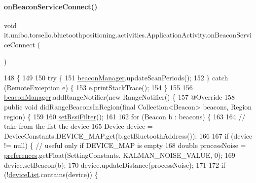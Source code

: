 \paragraph{\texorpdfstring{on\+Beacon\+Service\+Connect()}{onBeaconServiceConnect()}}
{\footnotesize\ttfamily void it.\+unibo.\+torsello.\+bluetoothpositioning.\+activities.\+Application\+Activity.\+on\+Beacon\+Service\+Connect (\begin{DoxyParamCaption}{ }\end{DoxyParamCaption})}


\begin{DoxyCode}
148                                          \{
149 
150         \textcolor{keywordflow}{try} \{
151             \hyperlink{classit_1_1unibo_1_1torsello_1_1bluetoothpositioning_1_1activities_1_1ApplicationActivity_a973c37226a3dbba6016966c3555aff65_a973c37226a3dbba6016966c3555aff65}{beaconManager}.updateScanPeriods();
152         \} \textcolor{keywordflow}{catch} (RemoteException e) \{
153             e.printStackTrace();
154         \}
155 
156         \hyperlink{classit_1_1unibo_1_1torsello_1_1bluetoothpositioning_1_1activities_1_1ApplicationActivity_a973c37226a3dbba6016966c3555aff65_a973c37226a3dbba6016966c3555aff65}{beaconManager}.addRangeNotifier(\textcolor{keyword}{new} RangeNotifier() \{
157             @Override
158             \textcolor{keyword}{public} \textcolor{keywordtype}{void} didRangeBeaconsInRegion(\textcolor{keyword}{final} Collection<Beacon> beacons, Region region) \{
159 
160                 \hyperlink{classit_1_1unibo_1_1torsello_1_1bluetoothpositioning_1_1activities_1_1ApplicationActivity_a8b2514096adfe574c15cc5317a45cd58_a8b2514096adfe574c15cc5317a45cd58}{setRssiFilter}();
161 
162                 \textcolor{keywordflow}{for} (Beacon b : beacons) \{
163 
164                     \textcolor{comment}{// take from the list the device}
165                     Device device = DeviceConstants.DEVICE\_MAP.get(b.getBluetoothAddress());
166 
167                     \textcolor{keywordflow}{if} (device != null) \{ \textcolor{comment}{// useful only if DEVICE\_MAP is empty}
168                         \textcolor{keywordtype}{double} processNoise = \hyperlink{classit_1_1unibo_1_1torsello_1_1bluetoothpositioning_1_1activities_1_1ApplicationActivity_a3ee672ef79c268d0618ff3276c2e85f0_a3ee672ef79c268d0618ff3276c2e85f0}{preferences}.getFloat(SettingConstants.
      KALMAN\_NOISE\_VALUE, 0);
169                         device.setBeacon(b);
170                         device.updateDistance(processNoise);
171 
172                         \textcolor{keywordflow}{if} (!\hyperlink{classit_1_1unibo_1_1torsello_1_1bluetoothpositioning_1_1activities_1_1ApplicationActivity_ad146f35cfee210f7191442658a235a2f_ad146f35cfee210f7191442658a235a2f}{deviceList}.contains(device)) \{

\end{DoxyCode}
